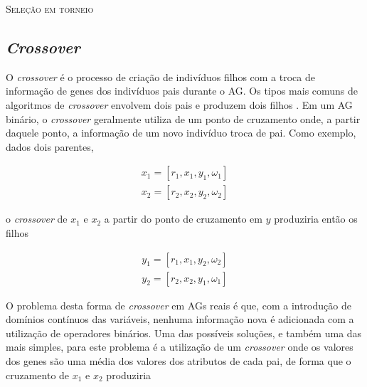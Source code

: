  \begin{algorithm}[!ht]
 \SetAlgoLined
 \caption{\textsc{Seleção em torneio}}\label{alg:tourn}
 \end{algorithm}

\subsection{\textit{Crossover}}
O \textit{crossover} é o processo de criação de indivíduos filhos com a troca de informação de genes dos indivíduos pais durante o AG. Os tipos mais comuns de algoritmos de \textit{crossover} envolvem dois pais e produzem dois filhos \cite{kora2006crossover}. Em um AG binário, o \textit{crossover} geralmente utiliza de um ponto de cruzamento onde, a partir daquele ponto, a informação de um novo indivíduo troca de pai. Como exemplo, dados dois parentes,

\begin{equation}
\begin{split}
x_1 = [ r_1, x_1, y_1, \omega_1 ] \\
x_2 = [ r_2, x_2, y_2, \omega_2 ]
\end{split}
\end{equation}

\noindent o \textit{crossover} de $x_1$ e $x_2$ a partir do ponto de cruzamento em $y$ produziria então os filhos

\begin{equation}
\begin{split}
y_1 = [ r_1, x_1, y_2, \omega_2 ] \\
y_2 = [ r_2, x_2, y_1, \omega_1 ]
\end{split}
\end{equation}

 O problema desta forma de \textit{crossover} em AGs reais é que, com a introdução de domínios contínuos das variáveis, nenhuma informação nova é adicionada com a utilização de operadores binários. Uma das possíveis soluções, e também uma das mais simples, para este problema é a utilização de um \textit{crossover} onde os valores dos genes são uma média dos valores dos atributos de cada pai, de forma que o cruzamento de $x_1$ e $x_2$ produziria 


